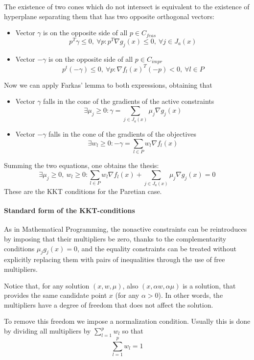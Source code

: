 The existence of two cones which do not intersect is equivalent to the existence of hyperplane separating them that has two opposite orthogonal vectors: 
\begin{itemize}
	\item Vector $\gamma$ is on the opposite side of all $p \in C_{feas}$
	$$ p^T \gamma \leq 0, \ \forall p : p^T \nabla g_j (x) \leq 0, \ \forall j \in J_a (x) $$
	
	\item Vector $- \gamma$ is on the opposite side of all $p \in C_{impr}$
	$$ p^t (- \gamma) \leq 0, \ \forall p : \nabla f_l (x)^T (-p) < 0, \ \forall l \in P $$
\end{itemize}
Now we can apply Farkas' lemma to both expressions, obtaining that
\begin{itemize}
	\item Vector $\gamma$ falls in the cone of the gradients of the active constraints
	$$ \exists \mu_j \geq 0 : \gamma = \sum_{j \in J_a (x)} \mu_j \nabla g_j (x) $$
	
	\item Vector $- \gamma$ falls in the cone of the gradients of the objectives
	$$ \exists w_l \geq 0: - \gamma = \sum_{l \in P} w_l \nabla f_l (x) $$
\end{itemize}
Summing the two equations, one obtains the thesis:
$$ \exists \mu_j\geq 0, \ w_l \geq 0 : \sum_{l \in P} w_l \nabla f_l (x) + \sum_{j \in J_a (x)} \mu_j\nabla g_j (x) = 0$$
These are the KKT conditions for the Paretian case.

\paragraph{Standard form of the KKT-conditions} As in Mathematical Programming, the nonactive constraints can be reintroduces by imposing that their multipliers be zero, thanks to the complementarity conditions $\mu_j g_j (x) = 0$, and the equality constraints can be treated without explicitly replacing them with pairs of inequalities through the use of free multipliers.

Notice that, for any solution $(x, w, \mu)$, also $(x, \alpha w, \alpha \mu)$ is a solution, that provides the same candidate point $x$ (for any $\alpha > 0$). In other words, the multipliers have a degree of freedom that does not affect the solution. 

To remove this freedom we impose a normalization condition. Usually this is done by dividing all multipliers by $\sum_{l = 1}^p w_l$ so that
$$ \sum_{l = 1}^p w_l = 1$$

